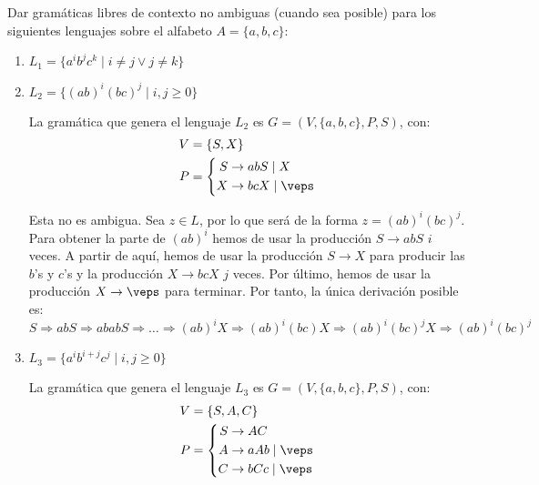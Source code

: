 \begin{ejercicio}\label{ej:1.4.7}
    Dar gramáticas libres de contexto no ambiguas (cuando sea posible) para los siguientes lenguajes sobre el alfabeto $A = \{ a, b, c \}$:
    \begin{enumerate}
        \item $L_1 = \{ a^i b^j c^k \mid i \neq j \lor j \neq k \}$

        \item $L_2 = \{ (ab)^i (bc)^j \mid i, j \geq 0 \}$
        
        La gramática que genera el lenguaje $L_2$ es $G=(V,\{a,b,c\},P,S)$, con:
        \begin{equation*}
            \begin{aligned}
                V &= \{ S, X \} \\
                P &= \left\{
                    \begin{aligned}
                        S &\rightarrow abS \mid X \\
                        X &\rightarrow bcX \mid \veps
                    \end{aligned}
                \right.
            \end{aligned}
        \end{equation*}

        Esta no es ambigua. Sea $z\in L$, por lo que será de la forma $z=(ab)^i(bc)^j$. Para obtener la parte de $(ab)^i$ hemos de usar la producción $S\rightarrow abS$ $i$ veces. A partir de aquí, hemos de usar la producción $S\rightarrow X$ para producir las $b$'s y $c$'s y la producción $X\rightarrow bcX$ $j$ veces. Por último, hemos de usar la producción $X\rightarrow \veps$ para terminar. Por tanto, la única derivación posible es:
        \begin{equation*}
            S\Rightarrow abS\Rightarrow ababS\Rightarrow \ldots \Rightarrow (ab)^iX\Rightarrow (ab)^i(bc)X \Rightarrow (ab)^i(bc)^jX \Rightarrow (ab)^i(bc)^j
        \end{equation*}
        \item $L_3 = \{ a^i b^{i+j} c^j \mid i, j \geq 0 \}$
        
        La gramática que genera el lenguaje $L_3$ es $G=(V,\{a,b,c\},P,S)$, con:
        \begin{equation*}
            \begin{aligned}
                V &= \{ S, A, C \} \\
                P &= \left\{
                    \begin{aligned}
                        S &\rightarrow AC \\
                        A &\rightarrow aAb \mid \veps \\
                        C &\rightarrow bCc \mid \veps
                    \end{aligned}
                \right.
            \end{aligned}
        \end{equation*}


\end{enumerate}
\end{ejercicio}
